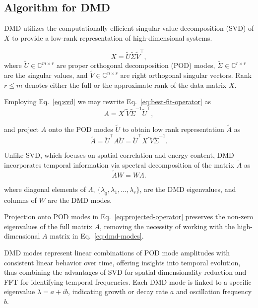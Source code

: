 \subsection{Algorithm for DMD}
DMD utilizes the computationally efficient singular value decomposition (SVD) of \(X\) to provide a low-rank representation of high-dimensional systems.

\begin{equation}\label{eq:svd}
	X = \tilde{U} \tilde{\Sigma} \tilde{V}^\top,
\end{equation}
where \(\tilde{U} \in \mathbb{C}^{m \times r}\) are proper orthogonal decomposition (POD) modes, \(\tilde{\Sigma} \in \mathbb{C}^{r \times r}\) are the singular values, and \( \tilde{V} \in \mathbb{C}^{n \times r}\) are right orthogonal singular vectors. Rank \(r \leq m\) denotes either the full or the approximate rank of the data matrix \(X\).

Employing Eq.~\ref{eq:svd} we may rewrite Eq.~\ref{eq:best-fit-operator} as
\begin{equation*}
	A = X^\prime \tilde{V} \tilde{\Sigma}^{-1} \tilde{U}^\top,
\end{equation*}

and project \(A\) onto the POD modes \(\tilde{U}\) to obtain low rank representation \(\tilde{A}\) as
\begin{equation}\label{eq:projected-operator}
	\tilde{A} = \tilde{U}^\top A \tilde{U} = \tilde{U}^\top X^\prime \tilde{V} \tilde{\Sigma}^{-1}.
\end{equation}

Unlike SVD, which focuses on spatial correlation and energy content, DMD incorporates temporal information via spectral decomposition of the matrix \(\tilde{A}\) as
\begin{equation}\label{eq:dmd-modes}
	\tilde{A} W = W \Lambda.
\end{equation}

where diagonal elements of \(\Lambda \), \({\{\lambda}_0, {\lambda}_1, \ldots, {\lambda}_r\} \), are the DMD eigenvalues, and columns of \(W\) are the DMD modes.

Projection onto POD modes in Eq.~\ref{eq:projected-operator} preserves the non-zero eigenvalues of the full matrix \(A\), removing the necessity of working with the high-dimensional \(A\) matrix in Eq.~\ref{eq:dmd-modes}.

DMD modes represent linear combinations of POD mode amplitudes with consistent linear behavior over time, offering insights into temporal evolution, thus combining the advantages of SVD for spatial dimensionality reduction and FFT for identifying temporal frequencies. Each DMD mode is linked to a specific eigenvalue \(\lambda = a + ib\), indicating growth or decay rate \(a\) and oscillation frequency \(b\).

